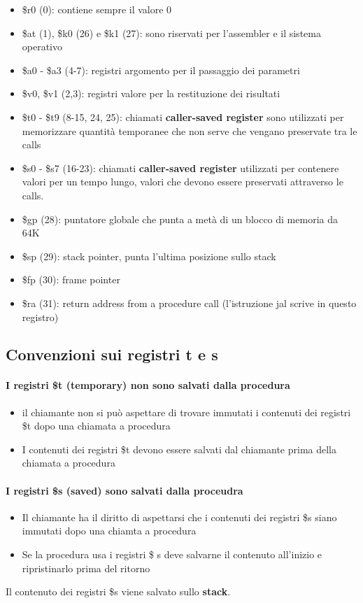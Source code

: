 \documentclass[12pt, a4paper, openany]{book}
\begin{document}
\begin{itemize}
    \item \$r0 (0): contiene sempre il valore 0
    \item \$at (1), \$k0 (26) e \$k1 (27): sono riservati per l'assembler e il sistema operativo
    \item \$a0 - \$a3 (4-7): registri argomento per il passaggio dei parametri
    \item \$v0, \$v1 (2,3): registri valore per la restituzione dei risultati
    \item \$t0 - \$t9 (8-15, 24, 25): chiamati \textbf{caller-saved register} sono utilizzati per memorizzare quantità temporanee
    che non serve che vengano preservate tra le calls
    \item \$s0 - \$s7 (16-23): chiamati \textbf{caller-saved register} utilizzati per contenere valori per un tempo lungo, valori
    che devono essere preservati attraverso le calls.
    \item \$gp (28): puntatore globale che punta a metà di un blocco di memoria da 64K 
    \item \$sp (29): stack pointer, punta l'ultima posizione sullo stack
    \item \$fp (30): frame pointer
    \item \$ra (31): return address from a procedure call (l'istruzione jal scrive in questo registro)
\end{itemize}
\subsection{Convenzioni sui registri t e s}
\paragraph{I registri \$t (temporary) non sono salvati dalla procedura} 
\begin{itemize}
    \item il chiamante non si può aspettare di trovare immutati i contenuti dei registri 
    \$t dopo una chiamata a procedura
    \item I contenuti dei registri \$t devono essere salvati dal chiamante prima della chiamata
    a procedura
\end{itemize}

\paragraph{I registri \$s (saved) sono salvati dalla proceudra}
\begin{itemize}
    \item Il chiamante ha il diritto di aspettarsi che i contenuti dei registri \$s siano
    immutati dopo una chiamta a procedura
    \item Se la procedura usa i registri \$ s deve salvarne il contenuto all'inizio e
    ripristinarlo prima del ritorno
\end{itemize}
Il contenuto dei registri \$s viene salvato sullo \textbf{stack}. 
\end{document}
